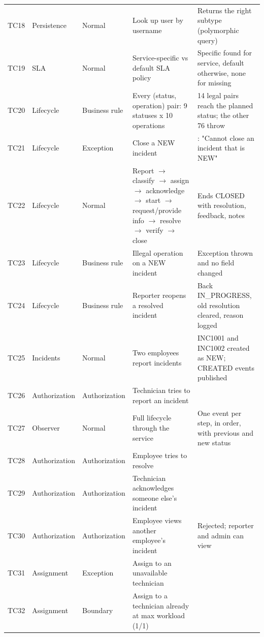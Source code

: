 \begin{longtable}{@{}L{1.0cm}L{1.85cm}L{2.15cm}L{4.05cm}L{5.45cm}@{}}
TC18 & Persistence & Normal & Look up user by username & Returns the right subtype (polymorphic query) \\
TC19 & SLA & Normal & Service-specific vs default SLA policy & Specific found for service, default otherwise, none for missing \\
TC20 & Lifecycle & Business rule & Every (status, operation) pair: 9 statuses x 10 operations & 14 legal pairs reach the planned status; the other 76 throw  \\
TC21 & Lifecycle & Exception & Close a NEW incident & : "Cannot close an incident that is NEW" \\
TC22 & Lifecycle & Normal & Report $\rightarrow$ classify $\rightarrow$ assign $\rightarrow$ acknowledge $\rightarrow$ start $\rightarrow$ request/provide info $\rightarrow$ resolve $\rightarrow$ verify $\rightarrow$ close & Ends CLOSED with resolution, feedback, notes \\
TC23 & Lifecycle & Business rule & Illegal operation on a NEW incident & Exception thrown and no field changed \\
TC24 & Lifecycle & Business rule & Reporter reopens a resolved incident & Back IN\_PROGRESS, old resolution cleared, reason logged \\
TC25 & Incidents & Normal & Two employees report incidents & INC1001 and INC1002 created as NEW; CREATED events published \\
TC26 & Authorization & Authorization & Technician tries to report an incident &  \\
TC27 & Observer & Normal & Full lifecycle through the service & One event per step, in order, with previous and new status \\
TC28 & Authorization & Authorization & Employee tries to resolve &  \\
TC29 & Authorization & Authorization & Technician acknowledges someone else's incident &  \\
TC30 & Authorization & Authorization & Employee views another employee's incident & Rejected; reporter and admin can view \\
TC31 & Assignment & Exception & Assign to an unavailable technician &  \\
TC32 & Assignment & Boundary & Assign to a technician already at max workload (1/1) &  \\

\end{longtable}
